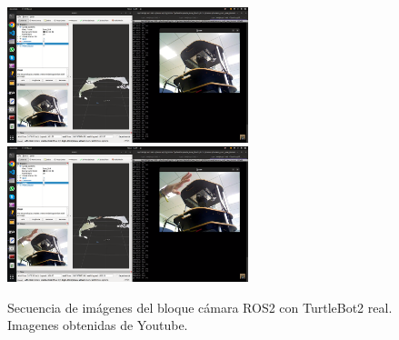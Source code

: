 \begin{figure} [H]
  \begin{center}
      \includegraphics[width=7cm]{figs/c4/camR1.png}
      \includegraphics[width=7cm]{figs/c4/camR2.png}
  \end{center}
  \caption[Secuencia bloque cámara ROS2 real]{Secuencia de imágenes del bloque cámara ROS2 con TurtleBot2 real. Imagenes obtenidas de Youtube\footnotemark.}
  \label{fig:vid_camR}
\end{figure}

